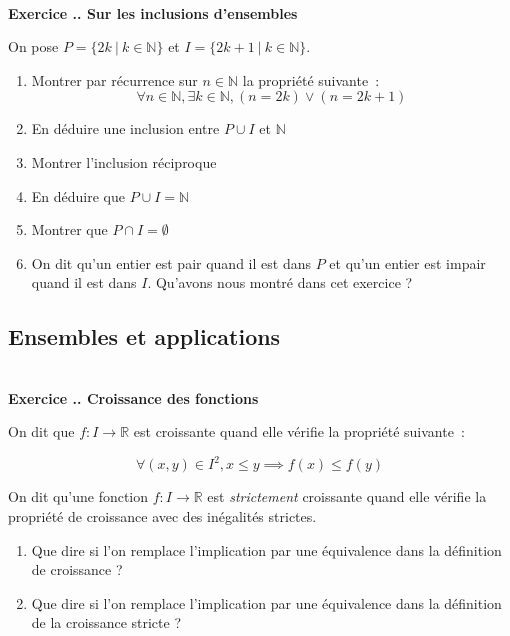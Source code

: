 \documentclass{article}
\newcommand{\mb}[1]{\mathbb{#1}}
\newcounter{exo}
\newcommand{\exercice}[1][\null]{\textbf{\\ \large Exercice \thesection.\theexo. \normalsize #1} \addtocounter{exo}{1}}
\begin{document}
\exercice[Sur les inclusions d'ensembles]

On pose $P = \{ 2k ~|~ k \in \mathbb{N} \}$ et $I = \{ 2k + 1 ~|~ k \in
\mathbb{N} \}$.

\begin{enumerate}
    \item Montrer par récurrence sur $n \in \mathbb{N}$ la propriété suivante~:
        \begin{equation}
            \forall n \in \mathbb{N}, \exists k \in \mathbb{N}, (n = 2k) \vee 
            (n = 2k + 1)
        \end{equation}
    \item En déduire une inclusion entre $P \cup I$ et $\mathbb{N}$
    \item Montrer l'inclusion réciproque
    \item En déduire que $P \cup I = \mathbb{N}$
    \item Montrer que $P \cap I = \emptyset$
    \item On dit qu'un entier est pair quand il est dans $P$ et qu'un 
        entier est impair quand il est dans $I$. Qu'avons nous montré 
        dans cet exercice ?
\end{enumerate}

\subsection{Ensembles et applications}

\exercice[Croissance des fonctions]

On dit que $f : I \to \mb{R}$ est croissante 
quand elle vérifie la propriété suivante~:

\begin{equation}
    \forall (x,y) \in I^2, x \leq y \implies f(x) \leq f(y)
\end{equation}

On dit qu'une fonction $f : I \to \mb{R}$ est \emph{strictement}
croissante quand elle vérifie la propriété de croissance avec 
des inégalités strictes.

\begin{enumerate}
    \item Que dire si l'on remplace l'implication par une équivalence 
        dans la définition de croissance ?
    \item Que dire si l'on remplace l'implication par une équivalence 
        dans la définition de la croissance stricte ?
\end{enumerate}
\end{document}
